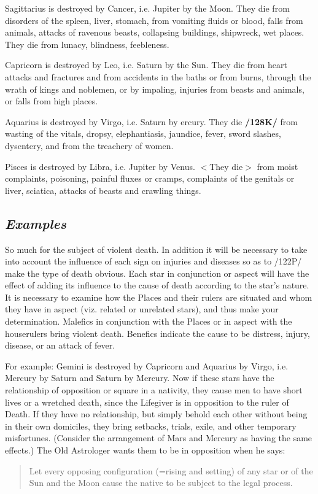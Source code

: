 Sagittarius \mn{\Sagittarius} is destroyed by Cancer, i.e. Jupiter by the Moon. They die from disorders of the spleen, liver, stomach, from vomiting fluids or blood, falls from animals, attacks of ravenous beasts, collapsing buildings, shipwreck, wet places. They die from lunacy, blindness, feebleness. 

Capricorn is destroyed by Leo, i.e. Saturn by the Sun. They die from heart attacks and fractures and from accidents in the baths or from burns, through the wrath of kings and noblemen, or by impaling, injuries from beasts and animals, or falls from high places.

Aquarius \mn{\Aquarius} is destroyed by Virgo, i.e. Saturn by ercury. They die \textbf{/128K/} from wasting of the vitals, dropsy, elephantiasis, jaundice, fever, sword slashes, dysentery, and from the treachery of women.

Pisces \mn{\Pisces} is destroyed by Libra, i.e. Jupiter by Venus. $<$They die$>$ from moist complaints, poisoning, painful fluxes or cramps, complaints of the genitals or liver, sciatica, attacks of beasts and crawling things.

\subsection{\textit{Examples}}
So much for the subject of violent death. In addition it will be necessary to take into account the influence of each sign on injuries and diseases so as to /122P/ make the type of death obvious. Each star in conjunction or aspect will have the effect of adding its influence to the cause of death according to the star’s nature. It is necessary to examine how the Places and their rulers are situated and whom they have in
aspect (viz. related or unrelated stars), and thus make your determination. Malefics in conjunction with the Places or in aspect with the houserulers bring violent death. Benefics indicate the cause to be distress, injury, disease, or an attack of fever. 

For example: Gemini is destroyed by Capricorn and Aquarius by Virgo, i.e. Mercury by Saturn and Saturn by Mercury. Now if these stars have the relationship of opposition or square in a nativity, they cause men to have short lives or a wretched death, since the Lifegiver is in opposition to the ruler of Death. If they have no relationship, but simply behold each other without being in their own domiciles, they bring setbacks, trials, exile, and other temporary misfortunes. (Consider the arrangement of Mars and Mercury as having the same effects.) The Old Astrologer wants them to be in opposition when he says: \begin{quote}Let every opposing configuration (=rising and setting) of any star or of the Sun and the Moon cause the native to be subject to the legal process.\end{quote}

